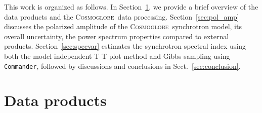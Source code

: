\documentclass[twocolumn]{../../common/aa}
\def\WMAP{\emph{WMAP}}
\def\commander{\texttt{Commander}}
\newcommand{\cosmoglobe}{\textsc{Cosmoglobe}}
\begin{document}
This work is organized as follows. In Section~\ref{sec:data}, we provide a brief overview of the data products and the \cosmoglobe\ data processing. Section~\ref{sec:pol_amp} discusses the polarized amplitude of the \cosmoglobe\ synchrotron model, its overall uncertainty, the power spectrum properties compared to external products. Section~\ref{sec:specvar} estimates the synchrotron spectral index using both the model-independent T-T plot method and Gibbs sampling using \commander, followed by discussions and conclusions in Sect.~\ref{sec:conclusion}.







\section{Data products}
\label{sec:data}
\end{document}
